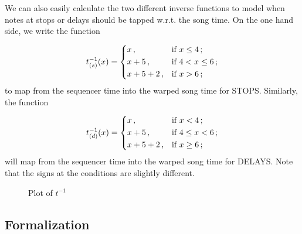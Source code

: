 \documentclass[a4paper,9pt]{article}
\begin{document}
We can also easily  calculate the two different inverse functions to model when notes at stops or delays should be tapped w.r.t. the song time. On the one hand side, we write the function

    \begin{equation}
	    t^{-1}_{(s)}(x) =\begin{dcases}
		    x\,, &\text{if $ x \leq 4 $}\,;\\
		    x+5\,,& \text{if $ 4 < x \leq 6 $}\,;\\
		    x+5+2\,,& \text{if $ x > 6 $}\,;\\
	    \end{dcases}
	    \label{eq:tostops}
    \end{equation}
    to map from the sequencer time into the warped song time for STOPS. Similarly, the function

    \begin{equation}
	    t^{-1}_{(d)}(x) =\begin{dcases}
		    x\,, &\text{if $ x < 4 $}\,;\\
		    x+5\,,& \text{if $ 4 \leq x < 6 $}\,;\\
		    x+5+2\,,& \text{if $ x \geq 6 $}\,;\\
	    \end{dcases}
	    \label{eq:todelays}
    \end{equation}
    will map from the sequencer time into the warped song time for DELAYS. Note that the signs at the conditions are slightly different.


\begin{figure}[htpb]
	\centering


\caption{Plot of $t^{-1}$ }
	\label{fig:seqtime2songtime}
\end{figure}

\subsection{Formalization}
\end{document}
